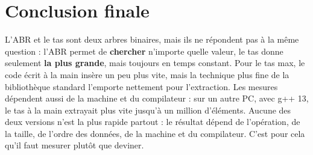 \documentclass[12pt,a4paper]{report}
\begin{document}
\section{Conclusion finale}
L'ABR et le tas sont deux arbres binaires, mais ils ne répondent pas à la même question : l'ABR permet de \textbf{chercher} n'importe quelle valeur, le tas donne seulement \textbf{la plus grande}, mais toujours en temps constant. Pour le tas max, le code écrit à la main insère un peu plus vite, mais la technique plus fine de la bibliothèque standard l'emporte nettement pour l'extraction. Les mesures dépendent aussi de la machine et du compilateur : sur un autre PC, avec g++ 13, le tas à la main extrayait plus vite jusqu'à un million d'éléments. Aucune des deux versions n'est la plus rapide partout : le résultat dépend de l'opération, de la taille, de l'ordre des données, de la machine et du compilateur. C'est pour cela qu'il faut mesurer plutôt que deviner.
\end{document}
